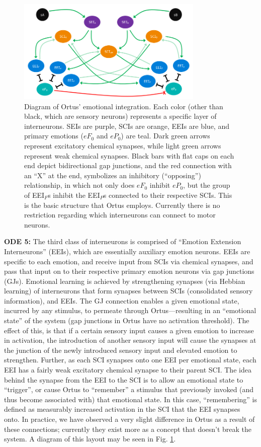 \documentclass[letterpaper]{article}
\begin{document}
\begin{figure}[t]
\begin{center}
\includegraphics[width=3.5in]{images/ortus_diagram.png}
\caption{Diagram of Ortus' emotional integration. Each color (other than black, which are sensory neurons) represents a specific layer of interneurons. SEIs are purple, SCIs are orange, EEIs are blue, and primary emotions ($eF_0$ and $eP_0$) are teal. Dark green arrows represent excitatory chemical synapses, while light green arrows represent weak chemical synapses. Black bars with flat caps on each end depict bidirectional gap junctions, and the red connection with an ``X'' at the end, symbolizes an inhibitory (``opposing'') relationship, in which not only does $eF_0$ inhibit $eP_0$, but the group of EEI$_F$s inhibit the EEI$_P$s connected to their respective SCIs. This is the basic structure that Ortus employs. Currently there is no restriction regarding which interneurons can connect to motor neurons.}
\label{diagram}
\end{center}
\end{figure}

\textbf{ODE 5:} The third class of interneurons is comprised of ``Emotion Extension Interneurons'' (EEIs), which are essentially auxiliary emotion neurons.
EEIs are specific to each emotion, and receive input from SCIs via chemical synapses, and pass that input on to their respective primary emotion neurons via gap junctions (GJs).
Emotional learning is achieved by strengthening synapses (via Hebbian learning) of interneurons that form synapses between SCIs (consolidated sensory information), and EEIs.
The GJ connection enables a given emotional state, incurred by any stimulus, to permeate through Ortus---resulting in an ``emotional state'' of the system (gap junctions in Ortus have no activation threshold).
The effect of this, is that if a certain sensory input causes a given emotion to increase in activation, the introduction of another sensory input will cause the synapses at the junction of the newly introduced sensory input and elevated emotion to strengthen. 
Further, as each SCI synapses onto one EEI per emotional state, each EEI has a fairly weak excitatory chemical synapse to their parent SCI.
The idea behind the synapse from the EEI to the SCI is to allow an emotional state to ``trigger'', or cause Ortus to ``remember'' a stimulus that previously invoked (and thus become associated with) that emotional state.
In this case, ``remembering'' is defined as measurably increased activation in the SCI that the EEI synapses onto.
In practice, we have observed a very slight difference in Ortus as a result of these connections; currently they exist more as a concept that doesn't break the system. A diagram of this layout may be seen in Fig. \ref{diagram}.
\end{document}
